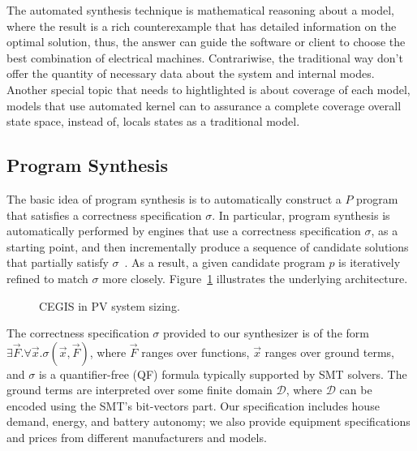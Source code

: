 \documentclass[10pt,journal,compsoc]{IEEEtran}
\begin{document}
\color{blue}
The automated synthesis technique is mathematical reasoning about a model, where the result is a rich counterexample that has detailed information on the optimal solution, thus, the answer can guide the software or client to choose the best combination of electrical machines. Contrariwise, the traditional way don't offer the quantity of necessary data about the system and internal modes. Another special topic that needs to hightlighted is about coverage of each model, models that use automated kernel can to assurance a complete coverage overall state space, instead of, locals states as a traditional model. 

\color{black}


\subsection{Program Synthesis}
\label{sec:ProgramSynthesis}
The basic idea of program synthesis is to automatically construct a $ P $ program that satisfies a correctness specification $\sigma$. In particular, program synthesis is automatically performed by engines that use a correctness specification $\sigma$, as a starting point, and then incrementally produce a sequence of candidate solutions that partially satisfy $\sigma$~\cite{Abateetal2017}. As a result, a given candidate program $p$ is iteratively refined to match $\sigma$ more closely. Figure~\ref{Counter-Example-Guided-Inductive-Synthesis} illustrates the underlying architecture. 
%
\begin{figure}[h]
\begin{center}
\end{center}
	\caption{CEGIS in PV system sizing.}
	\label{Counter-Example-Guided-Inductive-Synthesis}
\end{figure}

The correctness specification $\sigma$ provided to our synthesizer is of the form $\exists \vec{F}. \forall \vec{x}. \sigma(\vec{x}, \vec{F})$, where $\vec{F}$ ranges over functions, $\vec{x}$ ranges over ground terms, and $\sigma$ is a quantifier-free (QF) formula typically supported by SMT solvers. The ground terms are interpreted over some finite domain $\mathcal{D}$, where $\mathcal{D}$ can be encoded using the SMT's bit-vectors part. Our specification includes house demand, energy, and battery autonomy; we also provide equipment specifications and prices from different manufacturers and models.
\end{document}
